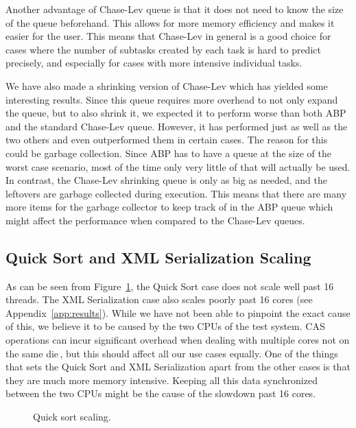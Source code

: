 Another advantage of Chase-Lev queue is that it does not need to know the size of the queue beforehand. This allows for more memory efficiency and makes it easier for the user. This means that Chase-Lev in general is a good choice for cases where the number of subtasks created by each task is hard to predict precisely, and especially for cases with more intensive individual tasks.

We have also made a shrinking version of Chase-Lev which has yielded some interesting results. Since this queue requires more overhead to not only expand the queue, but to also shrink it, we expected it to perform worse than both ABP and the standard Chase-Lev queue. However, it has performed just as well as the two others and even outperformed them in certain cases. The reason for this could be garbage collection. Since ABP has to have a queue at the size of the worst case scenario, most of the time only very little of that will actually be used. In contrast, the Chase-Lev shrinking queue is only as big as needed, and the leftovers are garbage collected during execution. This means that there are many more items for the garbage collector to keep track of in the ABP queue which might affect the performance when compared to the Chase-Lev queues.

\subsection{Quick Sort and XML Serialization Scaling}
As can be seen from Figure~\ref{fig:qsscaling}, the Quick Sort case does not scale well past 16 threads. The XML Serialization case also scales poorly past 16 cores (see Appendix~\ref{app:results}). While we have not been able to pinpoint the exact cause of this, we believe it to be caused by the two CPUs of the test system.
CAS operations can incur significant overhead when dealing with multiple cores not on the same die\,\cite[p. 19--20]{Dice06whatreally}, but this should affect all our use cases equally. One of the things that sets the Quick Sort and XML Serialization apart from the other cases is that they are much more memory intensive. Keeping all this data synchronized between the two CPUs might be the cause of the slowdown past 16 cores.

\begin{figure}
\caption{Quick sort scaling.}
\label{fig:qsscaling}
\end{figure}

